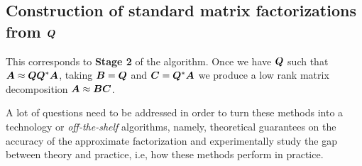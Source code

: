 \begin{figure}[ht]
\begin{center}
\end{center}
\end{figure}

\subsection*{Construction of standard matrix factorizations from $\bm{Q}$}

This corresponds to \textbf{Stage 2} of the algorithm. Once we have $\bm{Q}$
such that $\bm{A}\approx\bm{Q}\bm{Q}^*\bm{A}$, taking 
$\bm{B}=\bm{Q}$ and $\bm{C}=\bm{Q}^*\bm{A}$ we produce a low rank
matrix decomposition $\bm{A}\approx\bm{B}\bm{C}$.



A lot of questions need to be addressed in order to turn these methods into
a technology or \textit{off-the-shelf} algorithms, namely, 
theoretical guarantees on the accuracy of the approximate factorization and
experimentally study the gap between theory and practice, i.e, how these
methods perform in practice.
